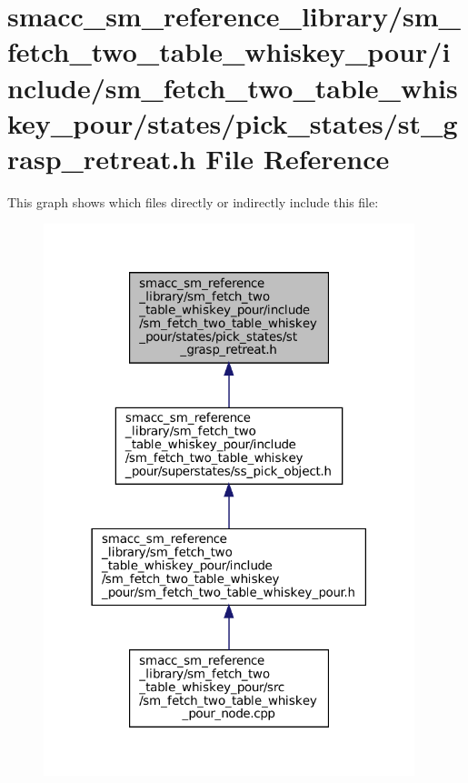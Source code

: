 \hypertarget{sm__fetch__two__table__whiskey__pour_2include_2sm__fetch__two__table__whiskey__pour_2states_2pic6986052e57644f8bc82a935efcbeeb3e}{}\section{smacc\+\_\+sm\+\_\+reference\+\_\+library/sm\+\_\+fetch\+\_\+two\+\_\+table\+\_\+whiskey\+\_\+pour/include/sm\+\_\+fetch\+\_\+two\+\_\+table\+\_\+whiskey\+\_\+pour/states/pick\+\_\+states/st\+\_\+grasp\+\_\+retreat.h File Reference}
\label{sm__fetch__two__table__whiskey__pour_2include_2sm__fetch__two__table__whiskey__pour_2states_2pic6986052e57644f8bc82a935efcbeeb3e}
This graph shows which files directly or indirectly include this file\+:
\nopagebreak
\begin{figure}[H]
\begin{center}
\leavevmode
\includegraphics[width=306pt]{sm__fetch__two__table__whiskey__pour_2include_2sm__fetch__two__table__whiskey__pour_2states_2picf2ea8035a57fce6555c2810d29d297ae}
\end{center}
\end{figure}

